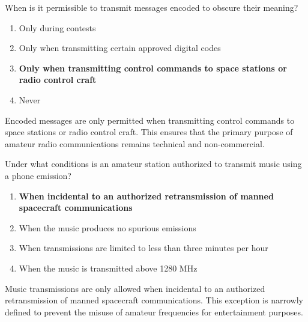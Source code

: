 
\begin{tcolorbox}[colback=gray!10!white,colframe=black!75!black,title={T1D03}]
When is it permissible to transmit messages encoded to obscure their meaning?
\begin{enumerate}[label=\Alph*,noitemsep]
    \item Only during contests
    \item Only when transmitting certain approved digital codes
    \item \textbf{Only when transmitting control commands to space stations or radio control craft}
    \item Never
\end{enumerate}
\end{tcolorbox}
Encoded messages are only permitted when transmitting control commands to space stations or radio control craft. This ensures that the primary purpose of amateur radio communications remains technical and non-commercial.


\begin{tcolorbox}[colback=gray!10!white,colframe=black!75!black,title={T1D04}]
Under what conditions is an amateur station authorized to transmit music using a phone emission?
\begin{enumerate}[label=\Alph*,noitemsep]
    \item \textbf{When incidental to an authorized retransmission of manned spacecraft communications}
    \item When the music produces no spurious emissions
    \item When transmissions are limited to less than three minutes per hour
    \item When the music is transmitted above 1280 MHz
\end{enumerate}
\end{tcolorbox}
Music transmissions are only allowed when incidental to an authorized retransmission of manned spacecraft communications. This exception is narrowly defined to prevent the misuse of amateur frequencies for entertainment purposes.


